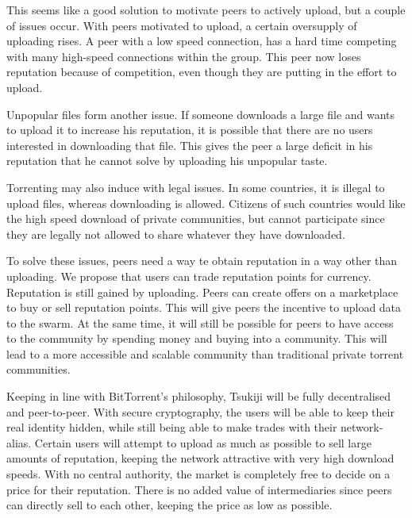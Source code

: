 This seems like a good solution to motivate peers to actively upload, but a couple of issues occur.\cite{bartercast}
With peers motivated to upload, a certain oversupply of uploading rises.
A peer with a low speed connection, has a hard time competing with many high-speed connections within the group.
This peer now loses reputation because of competition, even though they are putting in the effort to upload.

Unpopular files form another issue.
If someone downloads a large file and wants to upload it to increase his reputation, it is possible that there are no users interested in downloading that file.
This gives the peer a large deficit in his reputation that he cannot solve by uploading his unpopular taste.

Torrenting may also induce with legal issues. In some countries, it is illegal to upload files, whereas downloading is allowed.
Citizens of such countries would like the high speed download of private communities, but cannot participate since they are legally not allowed to share whatever they have downloaded.

To solve these issues, peers need a way te obtain reputation in a way other than uploading.
We propose that users can trade reputation points for currency.
Reputation is still gained by uploading.
Peers can create offers on a marketplace to buy or sell reputation points.
This will give peers the incentive to upload data to the swarm.
At the same time, it will still be possible for peers to have access to the community by spending money and buying into a community.
This will lead to a more accessible and scalable community than traditional private torrent communities.

Keeping in line with BitTorrent's philosophy, Tsukiji will be fully decentralised and peer-to-peer.
With secure cryptography, the users will be able to keep their real identity hidden, while still being able to make trades with their network-alias.
Certain users will attempt to upload as much as possible to sell large amounts of reputation, keeping the network attractive with very high download speeds.
With no central authority, the market is completely free to decide on a price for their reputation.
There is no added value of intermediaries since peers can directly sell to each other, keeping the price as low as possible.

